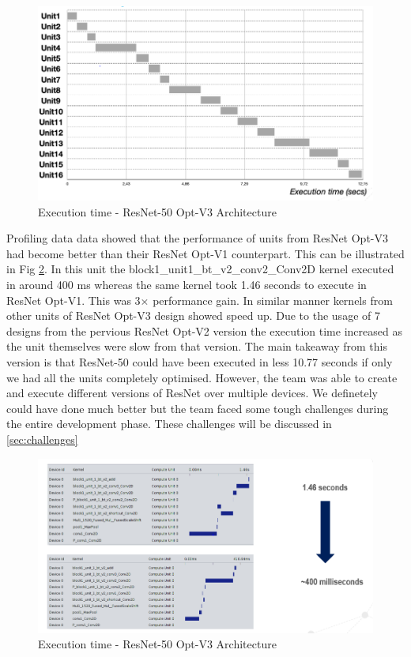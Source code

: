 \begin{figure}[!htb]
  \includegraphics[width=\textwidth,height=\textheight,keepaspectratio]{img/ResNet_OptV3_execution.png}
  \caption{Execution time - ResNet-50 Opt-V3 Architecture}
  \label{fig:ResNet50_Optv3}
\end{figure}
Profiling data data showed that the performance of units from ResNet Opt-V3 had become better than their ResNet Opt-V1 counterpart. This can be illustrated in Fig \ref{fig:ResNet50_Optv3_kernel}. In this unit the block1\_unit1\_bt\_v2\_conv2\_Conv2D kernel executed in around 400 ms whereas the same kernel took 1.46 seconds to execute in ResNet Opt-V1. This was 3$\times$ performance gain. In similar manner kernels from other units of ResNet Opt-V3 design showed speed up. Due to the usage of 7 designs from the pervious ResNet Opt-V2 version the execution time increased as the unit themselves were slow from that version. 
\newline
The main takeaway from this version is that ResNet-50 could have been executed in less 10.77 seconds if only we had all the units completely optimised. However, the team was able to create and execute different versions of ResNet over multiple devices. We definetely could have done much better but the team faced some tough challenges during the entire development phase. These challenges will be discussed in \ref{sec:challenges}

\begin{figure}[H]
  \includegraphics[width=\textwidth,height=\textheight,keepaspectratio]{img/ResNet_OptV3_performance.png}
  \caption{Execution time - ResNet-50 Opt-V3 Architecture}
  \label{fig:ResNet50_Optv3_kernel}
\end{figure}
